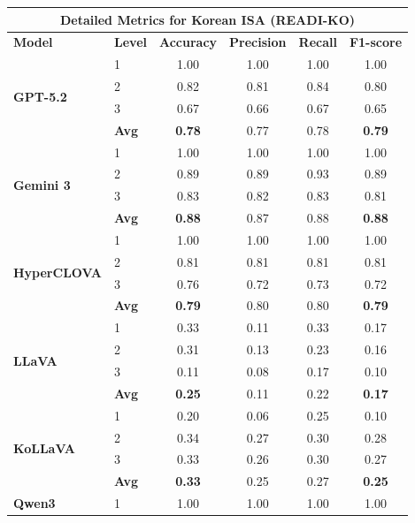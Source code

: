 \documentclass[11pt]{article}
\begin{document}
\begin{center}
    \small
    \begin{tabular}{llcccc}
        \toprule
        \multicolumn{6}{c}{\textbf{Detailed Metrics for Korean ISA (READI-KO)}} \\
        \toprule
        \textbf{Model} & \textbf{Level} & \textbf{Accuracy} & \textbf{Precision} & \textbf{Recall} & \textbf{F1-score} \\
        \midrule
        \multirow{4}{*}{\textbf{GPT-5.2}} & 1 & 1.00 & 1.00 & 1.00 & 1.00 \\
        & 2 & 0.82 & 0.81 & 0.84 & 0.80 \\
        & 3 & 0.67 & 0.66 & 0.67 & 0.65 \\
        & \textbf{Avg} & \textbf{0.78} & 0.77 & 0.78 & \textbf{0.79} \\
        \midrule
        \multirow{4}{*}{\textbf{Gemini 3}} & 1 & 1.00 & 1.00 & 1.00 & 1.00 \\
        & 2 & 0.89 & 0.89 & 0.93 & 0.89 \\
        & 3 & 0.83 & 0.82 & 0.83 & 0.81 \\
        & \textbf{Avg} & \textbf{0.88} & 0.87 & 0.88 & \textbf{0.88} \\
        \midrule
        \multirow{4}{*}{\textbf{HyperCLOVA}} & 1 & 1.00 & 1.00 & 1.00 & 1.00 \\
        & 2 & 0.81 & 0.81 & 0.81 & 0.81 \\
        & 3 & 0.76 & 0.72 & 0.73 & 0.72 \\
        & \textbf{Avg} & \textbf{0.79} & 0.80 & 0.80 & \textbf{0.79} \\
        \midrule
        \multirow{4}{*}{\textbf{LLaVA}} & 1 & 0.33 & 0.11 & 0.33 & 0.17 \\
        & 2 & 0.31 & 0.13 & 0.23 & 0.16 \\
        & 3 & 0.11 & 0.08 & 0.17 & 0.10 \\
        & \textbf{Avg} & \textbf{0.25} & 0.11 & 0.22 & \textbf{0.17} \\
        \midrule
        \multirow{4}{*}{\textbf{KoLLaVA}} & 1 & 0.20 & 0.06 & 0.25 & 0.10 \\
        & 2 & 0.34 & 0.27 & 0.30 & 0.28 \\
        & 3 & 0.33 & 0.26 & 0.30 & 0.27 \\
        & \textbf{Avg} & \textbf{0.33} & 0.25 & 0.27 & \textbf{0.25} \\
        \midrule
        \multirow{4}{*}{\textbf{Qwen3}} & 1 & 1.00 & 1.00 & 1.00 & 1.00 \\

\end{tabular}
\end{center}
\end{document}
